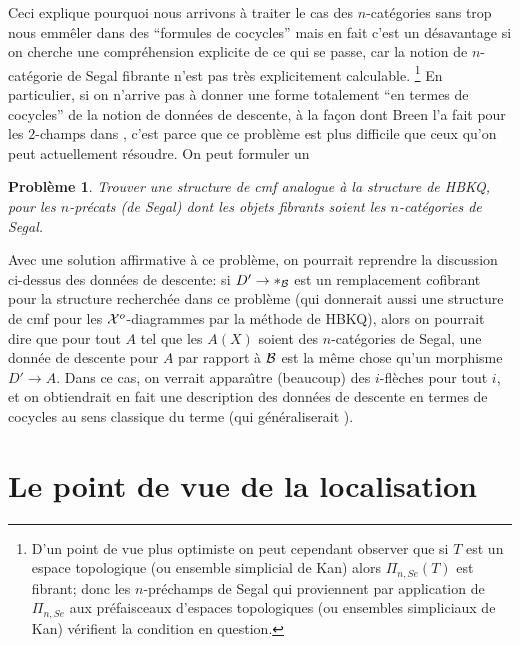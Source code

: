 \documentclass[12pt]{article}
\newcommand{\numero}[1]{\newpage\section{#1}}
\newtheorem{probleme}[lemma]{Probl\`eme}
\newcommand{\Bb}{{\cal B}}
\newcommand{\Xx}{{\cal X}}
\begin{document}
Ceci explique pourquoi nous arrivons \`a traiter le cas des $n$-cat\'egories
sans trop nous emm\^eler dans des ``formules de cocycles'' mais en fait
c'est un d\'esavantage si on cherche une compr\'ehension explicite de ce qui se
passe, car la notion de $n$-cat\'egorie de Segal fibrante n'est pas tr\`es
explicitement calculable.
\footnote{
D'un point de vue plus optimiste on peut cependant observer
que si $T$ est un espace topologique
(ou ensemble simplicial de Kan) alors $\Pi _{n,Se}(T)$ est fibrant; donc les
$n$-pr\'echamps de Segal qui proviennent par application de $\Pi _{n,Se}$ aux
pr\'efaisceaux d'espaces topologiques (ou ensembles simpliciaux de Kan)
v\'erifient
la condition  en question.}
En particulier, si on n'arrive pas \`a donner
une forme totalement ``en termes de cocycles'' de la notion de donn\'ees de
descente, \`a
la fa\c{c}on dont Breen l'a fait pour les $2$-champs dans
\cite{Breen},
c'est parce que ce probl\`eme est plus difficile que ceux qu'on peut
actuellement r\'esoudre. On peut formuler un

\begin{probleme}
Trouver une structure de cmf analogue \`a la structure de HBKQ, pour les
$n$-pr\'ecats (de Segal) dont les objets fibrants
soient les $n$-cat\'egories de Segal.
\end{probleme}

Avec une solution affirmative \`a ce probl\`eme, on pourrait reprendre la
discussion ci-dessus des donn\'ees de descente: si $D'\rightarrow \ast _{\Bb}$
est un remplacement cofibrant pour la structure recherch\'ee dans ce
probl\`eme (qui donnerait aussi une structure de cmf pour les
$\Xx^o$-diagrammes par la
m\'ethode de HBKQ), alors on pourrait dire que pour tout $A$ tel que les $A(X)$
soient des $n$-cat\'egories de Segal, une donn\'ee de descente pour $A$ par
rapport \`a $\Bb$ est la m\^eme chose qu'un morphisme $D'\rightarrow A$.
Dans ce cas, on verrait appara\^{\i}tre (beaucoup) des $i$-fl\`eches
pour tout $i$,
et on obtiendrait en fait une description des donn\'ees de
descente en termes de cocycles au sens
classique du terme (qui g\'en\'eraliserait \cite{Breen}).








\numero{Le point de vue de la localisation}
\label{localisationpage}

\end{document}
